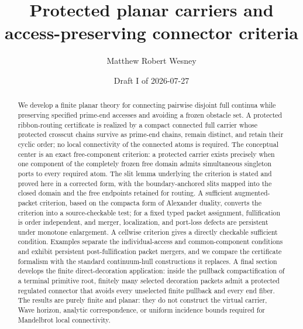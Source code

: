 \documentclass[11pt,reqno]{amsart}
\title[Protected planar carriers]{Protected planar carriers and\\access-preserving connector criteria}
\author{Matthew Robert Wesney}
\date{Draft I of 2026-07-27}
\theoremstyle{definition}
\theoremstyle{remark}
\begin{document}
\begin{abstract}
We develop a finite planar theory for connecting pairwise disjoint full
continua while preserving specified prime-end accesses and avoiding a frozen
obstacle set.  A protected ribbon-routing certificate is realized by a compact
connected full carrier whose protected crosscut chains survive as prime-end
chains, remain distinct, and retain their cyclic order; no local connectivity
of the connected atoms is required.  The conceptual center is an exact
free-component criterion: a protected carrier exists precisely when one
component of the completely frozen free domain admits simultaneous singleton
ports to every required atom.  The slit lemma underlying the criterion is
stated and proved here in a corrected form, with the boundary-anchored slits
mapped into the closed domain and the free endpoints retained for routing.  A
sufficient augmented-packet criterion, based on the compacta form of Alexander
duality, converts the criterion into a source-checkable test; for a fixed
typed packet assignment, fullification is order independent, and merger,
localization, and port-loss defects are persistent under monotone enlargement.
A cellwise criterion gives a directly checkable sufficient condition.
Examples separate the individual-access and common-component conditions and
exhibit persistent post-fullification packet mergers, and we compare the
certificate formalism with the standard continuum-hull constructions it
replaces.  A final section develops the finite direct-decoration application:
inside the pullback compactification of a terminal primitive root, finitely
many selected decoration packets admit a protected regulated connector that
avoids every unselected finite pullback and every end fiber.  The results are
purely finite and planar: they do not construct the virtual carrier, Wave
horizon, analytic correspondence, or uniform incidence bounds required for
Mandelbrot local connectivity.
\end{abstract}

\maketitle
\tableofcontents





\end{document}
